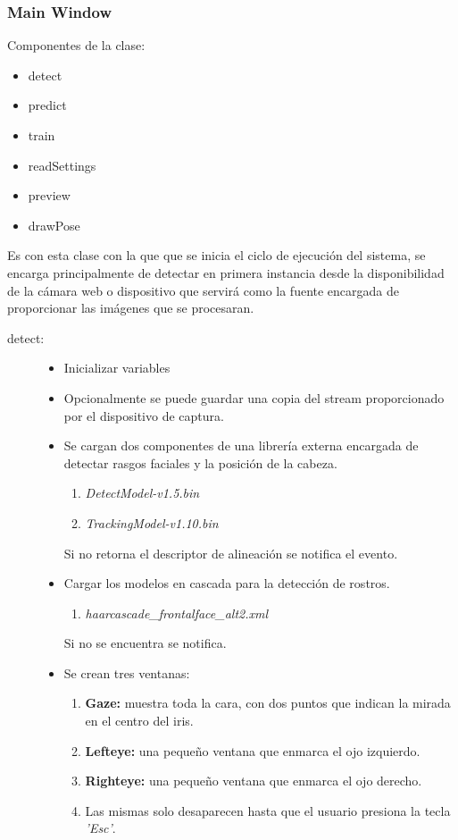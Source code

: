 \documentclass[12pt]{article} %
\begin{document}
        \subsubsection{Main Window}
        	Componentes de la clase:
        	\begin{itemize}
        		\item detect
        		\item predict
        		\item train
        		\item readSettings
        		\item preview
        		\item drawPose
        	\end{itemize}
		Es con esta clase con la que que se inicia el ciclo de ejecución del sistema, se encarga principalmente de detectar en primera instancia desde la
		disponibilidad de la cámara web o dispositivo que servirá como la fuente encargada de proporcionar las imágenes que se procesaran.
		\begin{description}
			\item[detect:] 
				\begin{itemize}
					\item Inicializar variables
					\item Opcionalmente se puede guardar una copia del stream proporcionado por el dispositivo de captura.
					\item Se cargan dos componentes de una librería externa encargada de detectar rasgos faciales y la posición de la cabeza.
						\begin{enumerate}
							\item \textit{DetectModel-v1.5.bin }
							\item \textit{TrackingModel-v1.10.bin }
						\end{enumerate}
						Si no retorna el descriptor de alineación se notifica el evento.
					\item Cargar los modelos en cascada para la detección de rostros.
						\begin{enumerate}
							\item \textit{haarcascade\_frontalface\_alt2.xml}
						\end{enumerate}
						Si no se encuentra se notifica.
					\item Se crean tres ventanas:
						\begin{enumerate}
							\item \textbf{Gaze:} muestra toda la cara, con dos puntos que indican la mirada en el centro del iris.
							\item \textbf{Lefteye:} una pequeño ventana que enmarca el ojo izquierdo.
							\item \textbf{Righteye:}  una pequeño ventana que enmarca el ojo derecho.
							\item Las mismas solo desaparecen hasta que el usuario presiona la tecla \textit{'Esc'}.
						\end{enumerate}
				\end{itemize}
		\end{description}
		
\end{document}

